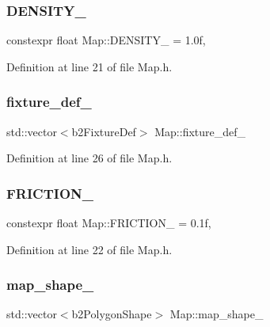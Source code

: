 \subsubsection{\texorpdfstring{D\+E\+N\+S\+I\+T\+Y\+\_\+}{DENSITY\_}}
{\footnotesize\ttfamily constexpr float Map\+::\+D\+E\+N\+S\+I\+T\+Y\+\_\+ = 1.\+0f\hspace{0.3cm}{\ttfamily [static]}, {\ttfamily [private]}}



Definition at line 21 of file Map.\+h.

\mbox{\label{classMap_a4ca70bdb2efc0b2a59018280f8d63419}} 
\subsubsection{\texorpdfstring{fixture\+\_\+def\+\_\+}{fixture\_def\_}}
{\footnotesize\ttfamily std\+::vector$<$b2\+Fixture\+Def$>$ Map\+::fixture\+\_\+def\+\_\+\hspace{0.3cm}{\ttfamily [private]}}



Definition at line 26 of file Map.\+h.

\mbox{\label{classMap_a16f21d5c0bb1ecd14d5d1ac20df1e101}} 
\subsubsection{\texorpdfstring{F\+R\+I\+C\+T\+I\+O\+N\+\_\+}{FRICTION\_}}
{\footnotesize\ttfamily constexpr float Map\+::\+F\+R\+I\+C\+T\+I\+O\+N\+\_\+ = 0.\+1f\hspace{0.3cm}{\ttfamily [static]}, {\ttfamily [private]}}



Definition at line 22 of file Map.\+h.

\mbox{\label{classMap_a831c5a01dc023fc32f11d267d693eec8}} 
\subsubsection{\texorpdfstring{map\+\_\+shape\+\_\+}{map\_shape\_}}
{\footnotesize\ttfamily std\+::vector$<$b2\+Polygon\+Shape$>$ Map\+::map\+\_\+shape\+\_\+\hspace{0.3cm}{\ttfamily [private]}}



